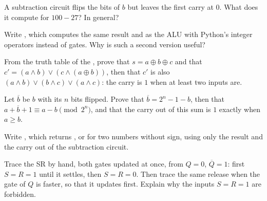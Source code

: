\begin{exercise}[$\star\star$]\label{exo:g11:gates-to-arithmetic-unit:10}
A subtraction circuit flips the bits of $b$ but leaves the first carry at $0$. What does it compute for $100 - 27$?
In general?
\end{exercise}

\begin{exercise}[$\star\star$]\label{exo:g11:gates-to-arithmetic-unit:11}
Write , which computes the same result and  as the ALU with Python's integer
operators instead of gates. Why is such a second version useful?
\end{exercise}

\begin{exercise}[$\star\star\star$]\label{exo:g11:gates-to-arithmetic-unit:12}
From the truth table of the , prove that $s = a \oplus b \oplus c$ and that
$c' = (a \wedge b) \vee (c \wedge (a \oplus b))$, then that $c'$ is also $(a \wedge b) \vee (b \wedge c) \vee
(a \wedge c)$: the carry is $1$ when at least two inputs are.
\end{exercise}

\begin{exercise}[$\star\star\star$]\label{exo:g11:gates-to-arithmetic-unit:13}
Let $\overline{b}$ be $b$ with its $n$ bits flipped. Prove that $\overline{b} = 2^n - 1 - b$, then that
$a + \overline{b} + 1 \equiv a - b \pmod{2^n}$, and that the carry out of this sum is $1$ exactly when $a \ge b$.
\end{exercise}

\begin{exercise}[$\star\star\star$]\label{exo:g11:gates-to-arithmetic-unit:14}
Write , which returns ,  or  for two numbers without sign, using
only the result and the carry out of the subtraction circuit.
\end{exercise}

\begin{exercise}[$\star\star\star$]\label{exo:g11:gates-to-arithmetic-unit:15}
Trace the SR  by hand, both gates updated at once, from $Q = 0$, $\overline{Q} = 1$: first $S = R = 1$ until it
settles, then $S = R = 0$. Then trace the same release when the gate of $Q$ is faster, so that it updates first.
Explain why the inputs $S = R = 1$ are forbidden.
\end{exercise}

